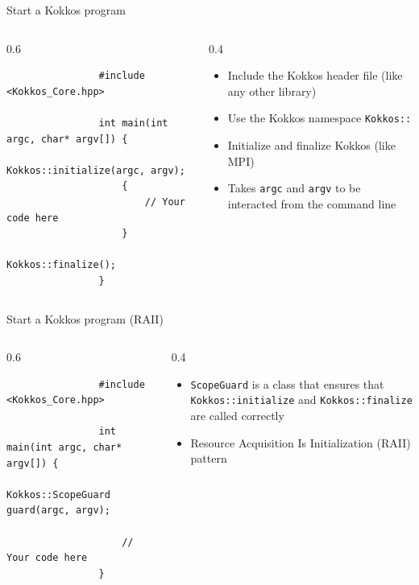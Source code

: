 \documentclass[
    aspectratio=169,
    \createHandout
]{beamer}
\begin{document}

\begin{frame}[fragile]{Start a Kokkos program}
    \begin{columns}
        \begin{column}{0.6\linewidth}
            \begin{verbatim}
                #include <Kokkos_Core.hpp>

                int main(int argc, char* argv[]) {
                    Kokkos::initialize(argc, argv);
                    {
                        // Your code here
                    }
                    Kokkos::finalize();
                }
            \end{verbatim}
        \end{column}
        \begin{column}{0.4\linewidth}
            \begin{itemize}
                \item Include the Kokkos header file (like any other library)
                \item Use the Kokkos namespace \texttt{Kokkos::}
                \item Initialize and finalize Kokkos (like MPI)
                \item Takes \texttt{argc} and \texttt{argv} to be interacted from the command line
            \end{itemize}
        \end{column}
    \end{columns}
\end{frame}


\begin{frame}[fragile]{Start a Kokkos program (RAII)}
    \begin{columns}
        \begin{column}{0.6\linewidth}
            \begin{verbatim}
                #include <Kokkos_Core.hpp>

                int main(int argc, char* argv[]) {
                    Kokkos::ScopeGuard guard(argc, argv);

                    // Your code here
                }
            \end{verbatim}
        \end{column}
        \begin{column}{0.4\linewidth}
            \begin{itemize}
                \item \texttt{ScopeGuard} is a class that ensures that \texttt{Kokkos::initialize} and \texttt{Kokkos::finalize} are called correctly
                \item Resource Acquisition Is Initialization (RAII) pattern
            \end{itemize}
        \end{column}
    \end{columns}
\end{frame}
\end{document}
